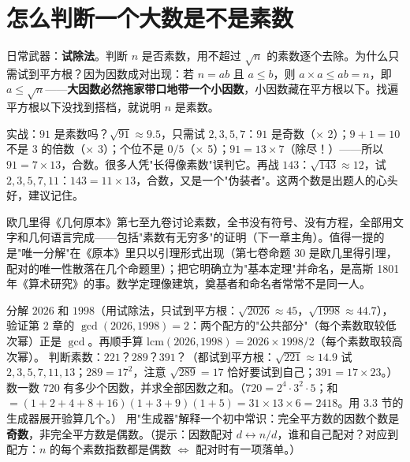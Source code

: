 \section{怎么判断一个大数是不是素数}

日常武器：\textbf{试除法}。判断 $n$ 是否素数，用不超过 $\sqrt{n}$ 的素数逐个去除。为什么只需试到平方根？因为因数成对出现：若 $n = ab$ 且 $a \le b$，则 $a\times a \le ab = n$，即 $a \le \sqrt{n}$——\textbf{大因数必然拖家带口地带一个小因数}，小因数藏在平方根以下。找遍平方根以下没找到搭档，就说明 $n$ 是素数。

实战：$91$ 是素数吗？$\sqrt{91} \approx 9.5$，只需试 $2, 3, 5, 7$：$91$ 是奇数（$\times$ 2）；$9+1 = 10$ 不是 $3$ 的倍数（$\times$ 3）；个位不是 $0/5$（$\times$ 5）；$91 = 13\times 7$（\checkmark 除尽！）——所以 $91 = 7\times 13$，合数。很多人凭"长得像素数"误判它。再战 $143$：$\sqrt{143}\approx 12$，试 $2,3,5,7,11$：$143 = 11\times 13$，合数，又是一个"伪装者"。这两个数是出题人的心头好，建议记住。

\begin{lishi}
欧几里得《几何原本》第七至九卷讨论素数，全书没有符号、没有方程，全部用文字和几何语言完成——包括"素数有无穷多"的证明（下一章主角）。值得一提的是"唯一分解"在《原本》里只以引理形式出现（第七卷命题 30 是欧几里得引理，配对的唯一性散落在几个命题里）；把它明确立为"基本定理"并命名，是高斯 1801 年《算术研究》的事。数学定理像建筑，奠基者和命名者常常不是同一人。
\end{lishi}

\begin{dongshou}
\begin{itemize}
  \yisi 分解 $2026$ 和 $1998$（用试除法，只试到平方根：$\sqrt{2026} \approx 45$，$\sqrt{1998}\approx 44.7$），验证第 2 章的 $\gcd(2026,1998) = 2$：两个配方的"公共部分"（每个素数取较低次幂）正是 $\gcd$。再顺手算 $\mathrm{lcm}(2026, 1998) = 2026\times 1998/2$（每个素数取较高次幂）。
  \yier 判断素数：$221$？$289$？$391$？（都试到平方根：$\sqrt{221}\approx 14.9$ 试 $2,3,5,7,11,13$；$289 = 17^2$，注意 $\sqrt{289} = 17$ 恰好要试到自己；$391 = 17\times 23$。）
  \yier 数一数 $720$ 有多少个因数，并求全部因数之和。（$720 = 2^4\cdot3^2\cdot5$；和 $= (1+2+4+8+16)(1+3+9)(1+5) = 31\times13\times6 = 2418$。用 3.3 节的生成器展开验算几个。）
  \yier 用"生成器"解释一个初中常识：完全平方数的因数个数是\textbf{奇数}，非完全平方数是偶数。（提示：因数配对 $d \leftrightarrow n/d$，谁和自己配对？对应到配方：$n$ 的每个素数指数都是偶数 $\iff$ 配对时有一项落单。）
\end{itemize}
\end{dongshou}

